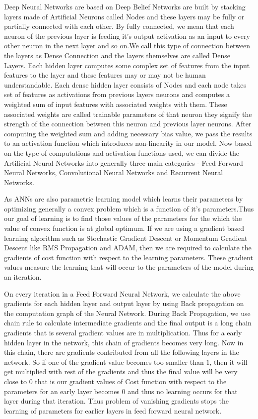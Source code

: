 \documentclass[12pt,a4paper]{article}
\begin{document}
Deep Neural Networks are based on Deep Belief Networks are built by stacking layers made of Artificial Neurons called Nodes and these layers may be fully or partially connected with each other. By fully connected, we mean that each neuron of the previous layer is feeding it's output activation as an input to every other neuron in the next layer and so on.We call this type of connection between the layers as Dense Connection and the layers themselves are called Dense Layers. Each hidden layer computes some complex set of features from the input features to the layer and these features may or may not be human understandable. Each dense hidden layer consists of Nodes and each node takes set of features as activations from previous layers neurons and computes a weighted sum of input features with associated weights with them. These associated weights are called trainable parameters of that neuron they signify the strength of the connection between this neuron and previous layer neurons. After computing the weighted sum and adding necessary bias value, we pass the results to an activation function which introduces non-linearity in our model. Now based on the type of computations and activation functions used, we can divide the Artificial Neural Networks into generally three main categories - Feed Forward Neural Networks, Convolutional Neural Networks and Recurrent Neural Networks.
\vspace{2mm}

As ANNs are also parametric learning model which learns their parameters by optimizing generally a convex problem which is a function of it’s parameters.Thus our goal of learning is to find those values of the parameters for the which the value of convex function is at global optimum. If we are using a gradient based learning algorithm such as Stochastic Gradient Descent or Momentum Gradient Descent like RMS Propagation and ADAM, then we are required to calculate the gradients of cost function with respect to the learning parameters. These gradient values measure the learning that will occur to the parameters of the model during an iteration. 
\vspace{2mm}

On every iteration in a Feed Forward Neural Network, we calculate the above gradients for each hidden layer and output layer by using Back propagation on the computation graph of the Neural Network. During Back Propagation, we use chain rule to calculate intermediate gradients and the final output is a long chain gradients that is several gradient values are in multiplication. Thus for a early hidden layer in the network, this chain of gradients becomes very long. Now in this chain, there are gradients contributed from all the following layers in the network. So if one of the gradient value becomes too smaller than $1$, then it will get multiplied with rest of the gradients and thus the final value will be very close to $0$ that is our gradient values of Cost function with respect to the parameters for an early layer becomes $0$ and thus no learning occurs for that layer during that iteration. Thus problem of vanishing gradients stops the learning of parameters for earlier layers in feed forward neural network.
\vspace{2mm}
\end{document}
